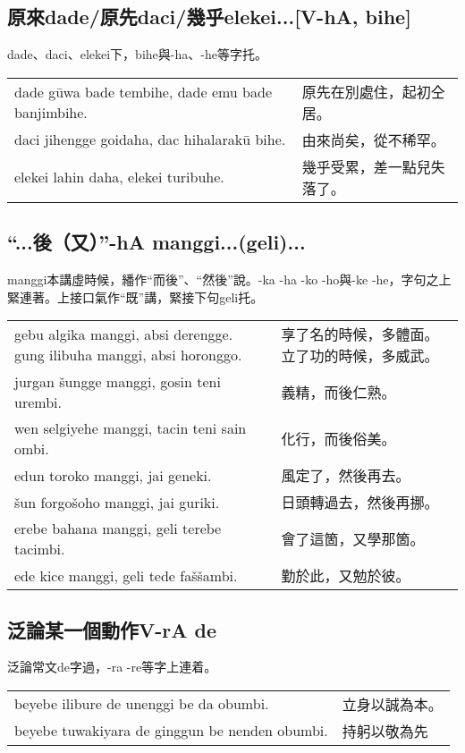 \documentclass{article}
\begin{document}
\subsection{原來dade/原先daci/幾乎elekei...[V-hA, bihe]}
\noindent dade、daci、elekei下，bihe與-ha、-he等字托。
\begin{center}
    \begin{tabularx}{\textwidth}{XX}
        dade g\={u}wa bade tembihe, dade emu bade banjimbihe. & 原先在別處住，起初仝居。\\
        daci jihengge goidaha, dac hihalarak\={u} bihe. & 由來尚矣，從不稀罕。\\
        elekei lahin daha, elekei turibuhe. & 幾乎受累，差一點兒失落了。
    \end{tabularx}
\end{center}

\subsection{“...後（又）”-hA manggi...(geli)...}
\noindent manggi本講虛時候，繙作“而後”、“然後”說。-ka -ha -ko -ho與-ke -he，字句之上緊連著。上接口氣作“既”講，緊接下句geli托。
\begin{center}
    \begin{tabularx}{\textwidth}{XX}
        gebu algika manggi, absi derengge. gung ilibuha manggi, absi horonggo. & 享了名的時候，多體面。立了功的時候，多威武。\\
        jurgan \v{s}ungge manggi, gosin teni urembi. & 義精，而後仁熟。\\
        wen selgiyehe manggi, tacin teni sain ombi. & 化行，而後俗美。\\
        edun toroko manggi, jai geneki. & 風定了，然後再去。\\
        \v{s}un forgo\v{s}oho manggi, jai guriki. & 日頭轉過去，然後再挪。\\
        erebe bahana manggi, geli terebe tacimbi. & 會了這箇，又學那箇。\\
        ede kice manggi, geli tede fa\v{s}\v{s}ambi. & 勤於此，又勉於彼。
    \end{tabularx}
\end{center}

\subsection{泛論某一個動作V-rA de}
\noindent 泛論常文de字過，-ra -re等字上連着。
\begin{center}
    \begin{tabularx}{\textwidth}{XX}
        beyebe ilibure de unenggi be da obumbi. & 立身以誠為本。\\
        beyebe tuwakiyara de ginggun be nenden obumbi. & 持躬以敬為先
    \end{tabularx}
\end{center}
\end{document}
